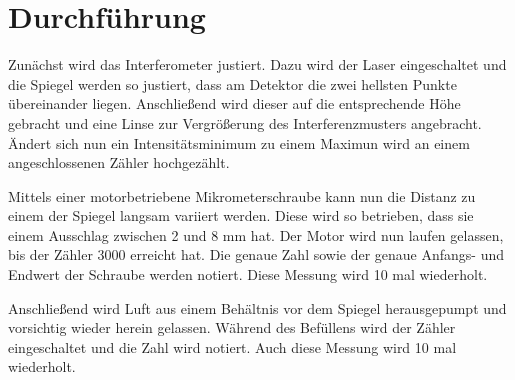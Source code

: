 \section{Durchführung}
\label{sec:Durchführung}

Zunächst wird das Interferometer justiert.
Dazu wird der Laser eingeschaltet und die Spiegel werden so justiert, dass am Detektor die zwei hellsten Punkte übereinander liegen.
Anschließend wird dieser auf die entsprechende Höhe gebracht und eine Linse zur Vergrößerung des Interferenzmusters angebracht.
Ändert sich nun ein Intensitätsminimum zu einem Maximun wird an einem angeschlossenen Zähler hochgezählt.

Mittels einer motorbetriebene Mikrometerschraube kann nun die Distanz zu einem der Spiegel langsam variiert werden.
Diese wird so betrieben, dass sie einem Ausschlag zwischen 2 und 8 mm hat.
Der Motor wird nun laufen gelassen, bis der Zähler 3000 erreicht hat. Die genaue Zahl sowie der genaue Anfangs- und Endwert der Schraube werden notiert.
Diese Messung wird 10 mal wiederholt.

Anschließend wird Luft aus einem Behältnis vor dem Spiegel herausgepumpt und vorsichtig wieder herein gelassen.
Während des Befüllens wird der Zähler eingeschaltet und die Zahl wird notiert.
Auch diese Messung wird 10 mal wiederholt.